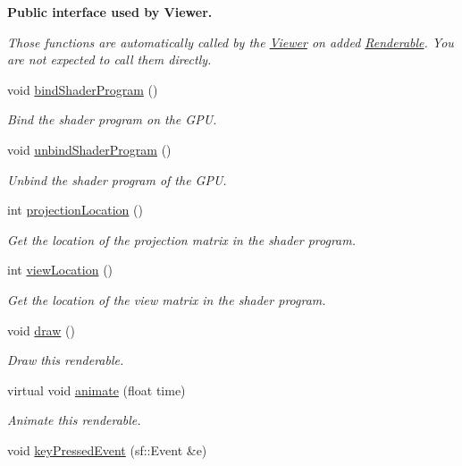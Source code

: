 \begin{Indent}{\bf Public interface used by Viewer.}\par
{\em Those functions are automatically called by the \hyperlink{classViewer}{Viewer} on added \hyperlink{classRenderable}{Renderable}. You are not expected to call them directly. }\begin{DoxyCompactItemize}
\item 
void \hyperlink{classRenderable_aaa73d54539b1b84d5b3e12293d7b3610}{bind\+Shader\+Program} ()
\begin{DoxyCompactList}\small\item\em Bind the shader program on the G\+P\+U. \end{DoxyCompactList}\item 
void \hyperlink{classRenderable_a1d3d81445852e84244bc6f5c3f078292}{unbind\+Shader\+Program} ()
\begin{DoxyCompactList}\small\item\em Unbind the shader program of the G\+P\+U. \end{DoxyCompactList}\item 
int \hyperlink{classRenderable_a905c76682e391c2aed94f021447bf63d}{projection\+Location} ()
\begin{DoxyCompactList}\small\item\em Get the location of the projection matrix in the shader program. \end{DoxyCompactList}\item 
int \hyperlink{classRenderable_a3e7c969092e6e42d30fec9dfa6ba988a}{view\+Location} ()
\begin{DoxyCompactList}\small\item\em Get the location of the view matrix in the shader program. \end{DoxyCompactList}\item 
void \hyperlink{classRenderable_a0d371901a19b8cfe50b76b842adba70a}{draw} ()
\begin{DoxyCompactList}\small\item\em Draw this renderable. \end{DoxyCompactList}\item 
virtual void \hyperlink{classRenderable_a74fd37d6852fb727e1a5fe72541d269d}{animate} (float time)
\begin{DoxyCompactList}\small\item\em Animate this renderable. \end{DoxyCompactList}\item 
void \hyperlink{classRenderable_a02e29d97fae52b6240ffb43ac5fb82de}{key\+Pressed\+Event} (sf\+::\+Event \&e)

\end{DoxyCompactItemize}
\end{Indent}
